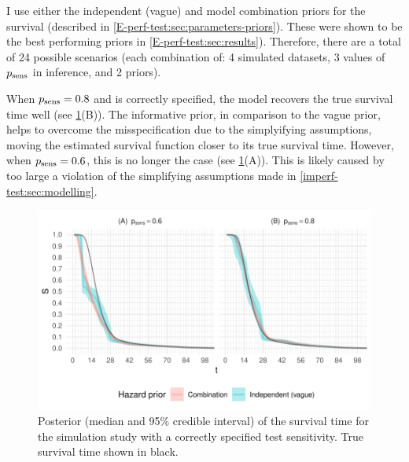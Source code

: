 \documentclass[thesis.tex]{subfiles}
\begin{document}
I use either the independent (vague) and model combination priors for the survival (described in \cref{E-perf-test:sec:parameters-priors}).
These were shown to be the best performing priors in \cref{E-perf-test:sec:results}).
Therefore, there are a total of 24 possible scenarios (each combination of: 4 simulated datasets, 3 values of $p_\text{sens}$ in inference, and 2 priors).

When $p_\text{sens} = 0.8$ and is correctly specified, the model recovers the true survival time well (see \cref{imperf-test:fig:constant-test-sensitivity}(B)).
The informative prior, in comparison to the vague prior, helps to overcome the misspecification due to the simplyifying assumptions, moving the estimated survival function closer to its true survival time.
However, when $p_\text{sens} = 0.6$, this is no longer the case (see \cref{imperf-test:fig:constant-test-sensitivity}(A)).
This is likely caused by too large a violation of the simplifying assumptions made in \cref{imperf-test:sec:modelling}.
\begin{figure}
  \includegraphics[width=\textwidth]{cis-imperfect-testing/sim-constant-sensitivity}
  \caption[Simulation study results with constant test sensitivity]{%
    Posterior (median and 95\% credible interval) of the survival time for the simulation study with a correctly specified test sensitivity.
    True survival time shown in black.
  }
  \label{imperf-test:fig:constant-test-sensitivity}
\end{figure}
\end{document}
